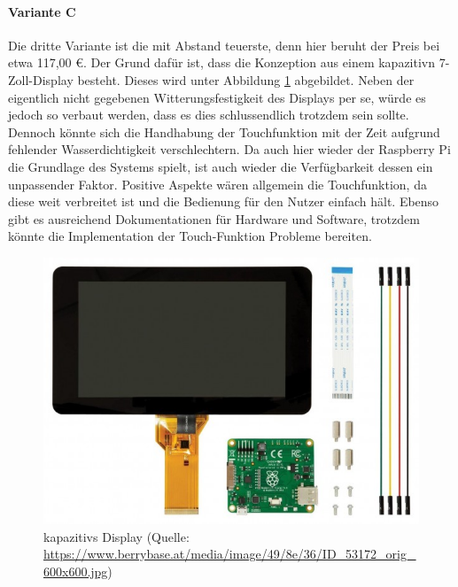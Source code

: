 \paragraph{Variante C}
Die dritte Variante ist die mit Abstand teuerste, denn hier beruht der Preis bei etwa 117,00 €. Der Grund dafür ist, dass die Konzeption aus einem \gls{kapazitiv}n 7-Zoll-Display besteht. Dieses wird unter Abbildung \ref{fig:kapazitives_display} abgebildet. Neben der eigentlich nicht gegebenen Witterungsfestigkeit des Displays per se, würde es jedoch so verbaut werden, dass es dies schlussendlich trotzdem sein sollte. Dennoch könnte sich die Handhabung der Touchfunktion mit der Zeit aufgrund fehlender Wasserdichtigkeit verschlechtern. Da auch hier wieder der Raspberry Pi die Grundlage des Systems spielt, ist auch wieder die Verfügbarkeit dessen ein unpassender Faktor. Positive Aspekte wären allgemein die Touchfunktion, da diese weit verbreitet ist und die Bedienung für den Nutzer einfach hält. Ebenso gibt es ausreichend Dokumentationen für Hardware und Software, trotzdem könnte die Implementation der Touch-Funktion Probleme bereiten.
\begin{figure}[ht]
	\centering
	\includegraphics[width=0.6\linewidth]{Bilder/kapazitives_display.jpg}
	\caption{\gls{kapazitiv}s Display (Quelle: \url{https://www.berrybase.at/media/image/49/8e/36/ID_53172_orig_600x600.jpg})}
	\label{fig:kapazitives_display}
\end{figure}
\newpage
